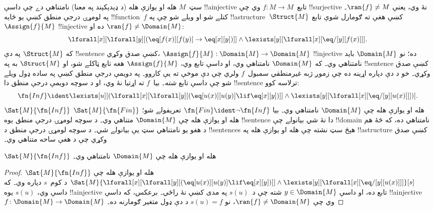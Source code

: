 \documentclass[../../../include/open-logic-section]{subfiles}
\begin{document}


سټ~$M$ هله او يوازې هله (د ډېدېکېند په معنا) نامتناهي دے چې داسې
!!a{injective} تابع~$f\colon M \to M$ وي چې !!{surjective} نۀ وي،
يعنې $\ran{f} \neq M$۔ په لومړۍ درجې منطق کښې يو ځايه
!!{function}~$f$ کتلے شو او ويلے شو چې په
!!a{structure}~$\Struct{M}$ کښې هغې ته ګومارل شوې
تابع~$\Assign{f}{M}$ !!{injective} ده او $\ran{f} \neq
\Domain{M}$:
\[
\lforall[x][\lforall[y][(\eq[f(x)][f(y)] \to \eq[x][y])]] \land
\lexists[y][\lforall[x][\eq/[y][f(x)]]].
\]
که $\Struct{M}$ په دې !!{sentence} کښې صدق وکړي،
$\Assign{f}{M}: \Domain{M} \to \Domain{M}$ !!{injective} ده؛ نو
$\Domain{M}$ بايد نامتناهي وي۔ که $\Domain{M}$ نامتناهي وي، او
داسې تابع وي، $\Assign{f}{M}$ هغه تابع ټاکلے شو، او $\Struct{M}$ به
په !!{sentence} کښې صدق وکړي۔ خو د دې دپاره اړينه ده چې زموږ ژبه
غيرمنطقي سمبول~$f$ ولري چې دې موخې ته يې کاروو۔ په دويمې درجې
منطق کښې په ساده ډول ويلے شو چې داسې تابع \emph{شته}۔ بيا~$f$ ته
اړتيا نۀ وي، او د سوچه دويمې درجې منطق دا !!{sentence} ترلاسه کوو:
\[
\fn{Inf} \ident \lexists[u][(\lforall[x][\lforall[y][(\eq[u(x)][u(y)]
      \lif \eq[x][y])]] \land \lexists[y][\lforall[x][\eq/[y][u(x)]]])].
\]
$\Sat{M}{\fn{Inf}}$ هله او يوازې هله چې $\Domain{M}$ نامتناهي
وي۔ بيا $\fn{Fin} \ident \lnot \fn{Inf}$ تعريفولے شو؛
$\Sat{M}{\fn{Fin}}$ هله او يوازې هله چې $\Domain{M}$ متناهي وي۔
د سوچه لومړۍ درجې منطق يوه !!{sentence} دا نۀ شي بيانولے چې
!!{domain} نامتناهي ده، که څۀ هم د هغو يو نامتناهي سټ يې بيانولے
شي۔ د سوچه لومړۍ درجې منطق د !!{sentence}s هېڅ سټ نشته چې هله او
يوازې هله په !!a{structure} کښې صدق وکړي چې د هغې ساحه متناهي وي۔

\begin{prop}
$\Sat{M}{\fn{Inf}}$ هله او يوازې هله چې $\Domain{M}$ نامتناهي وي۔
\end{prop}

\begin{proof}
$\Sat{M}{\fn{Inf}}$ هله او يوازې هله چې
  $\Sat{M}{\lforall[x][\lforall[y][(\eq[u(x)][u(y)] \lif \eq[x][y])]]
    \land \lexists[y][\lforall[x][\eq/[y][u(x)]]]}[s]$ د کوم~$s$
  دپاره وي۔ که داسې وي، $s(u)$ يوه !!a{injective} تابع ده، او داسې
  $y \in \Domain{M}$ شته چې د~$s(u)$ په مدى کښې نۀ راځي۔ برعکس،
  که داسې !!a{injective} $f\colon \Domain{M} \to \Domain{M}$ وي چې
  $\ran{f} \neq \Domain{M}$، نو $s(u) = f$ د دې ډول متغير ګومارنه
  ده۔
\end{proof}
\end{document}
